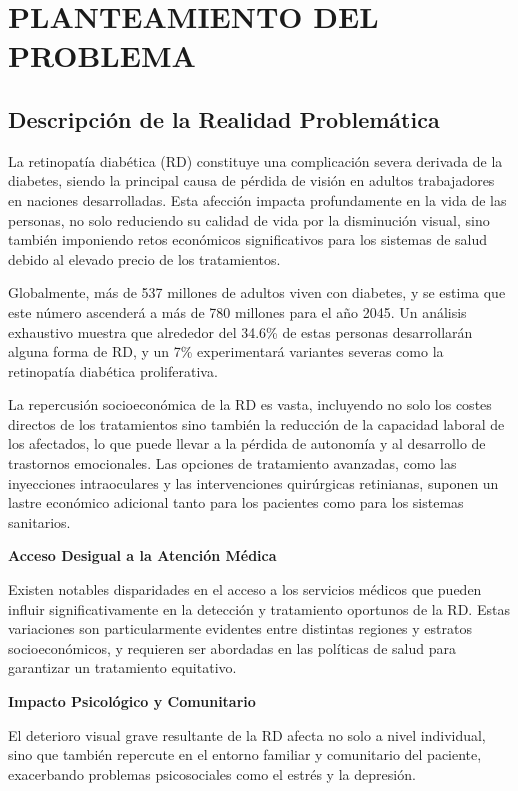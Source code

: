 \chapter{PLANTEAMIENTO DEL PROBLEMA}
\section{Descripción de la Realidad Problemática}

La retinopatía diabética (RD) constituye una complicación severa derivada de la diabetes, siendo la principal causa de pérdida de visión en adultos trabajadores en naciones desarrolladas. Esta afección impacta profundamente en la vida de las personas, no solo reduciendo su calidad de vida por la disminución visual, sino también imponiendo retos económicos significativos para los sistemas de salud debido al elevado precio de los tratamientos.

Globalmente, más de 537 millones de adultos viven con diabetes, y se estima que este número ascenderá a más de 780 millones para el año 2045. Un análisis exhaustivo muestra que alrededor del 34.6\% de estas personas desarrollarán alguna forma de RD, y un 7\% experimentará variantes severas como la retinopatía diabética proliferativa.

La repercusión socioeconómica de la RD es vasta, incluyendo no solo los costes directos de los tratamientos sino también la reducción de la capacidad laboral de los afectados, lo que puede llevar a la pérdida de autonomía y al desarrollo de trastornos emocionales. Las opciones de tratamiento avanzadas, como las inyecciones intraoculares y las intervenciones quirúrgicas retinianas, suponen un lastre económico adicional tanto para los pacientes como para los sistemas sanitarios.

\textbf{ Acceso Desigual a la Atención Médica}

Existen notables disparidades en el acceso a los servicios médicos que pueden influir significativamente en la detección y tratamiento oportunos de la RD. Estas variaciones son particularmente evidentes entre distintas regiones y estratos socioeconómicos, y requieren ser abordadas en las políticas de salud para garantizar un tratamiento equitativo.

\textbf{ Impacto Psicológico y Comunitario}

El deterioro visual grave resultante de la RD afecta no solo a nivel individual, sino que también repercute en el entorno familiar y comunitario del paciente, exacerbando problemas psicosociales como el estrés y la depresión.

